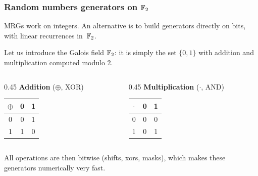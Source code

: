 \documentclass[aspectratio=169]{beamer}
\def\blue{\color{blue}}
\begin{document}
		
\begin{frame}
		\frametitle{Random numbers generators on ${\mathbb{F}}_2$}
		
		MRGs work on integers. An alternative is to build generators directly
		on {\blue bits}, with {\blue linear recurrences in}\, ${\mathbb{F}}_2$.
		
		\vspace{0.2cm}
		
		Let us introduce the Galois field ${\mathbb{F}}_2$: it is simply the set $\lbrace 0,1 \rbrace$
		with addition and multiplication computed modulo 2.
		
		\vspace{0.2cm}
		\begin{columns}
		\begin{column}{0.45\textwidth}
		\centering
		\textbf{Addition} ($\oplus$, XOR) \\
		\vspace{0.1cm}
		\begin{tabular}{c|cc}
		$\oplus$ & 0 & 1 \\
		\hline
		0 & 0 & 1 \\
		1 & 1 & 0
		\end{tabular}
		\end{column}
		
		\begin{column}{0.45\textwidth}
		\centering
		\textbf{Multiplication} ($\cdot$, AND) \\
		\vspace{0.1cm}
		\begin{tabular}{c|cc}
		$\cdot$ & 0 & 1 \\
		\hline
		0 & 0 & 0 \\
		1 & 0 & 1
		\end{tabular}
		\end{column}
		\end{columns}
		
		\vspace{0.4cm}
		
		All operations are then {\blue bitwise} (shifts, xors, masks),
		which makes these generators {\blue numerically very fast}.
		
	\end{frame}
	
\end{document}
